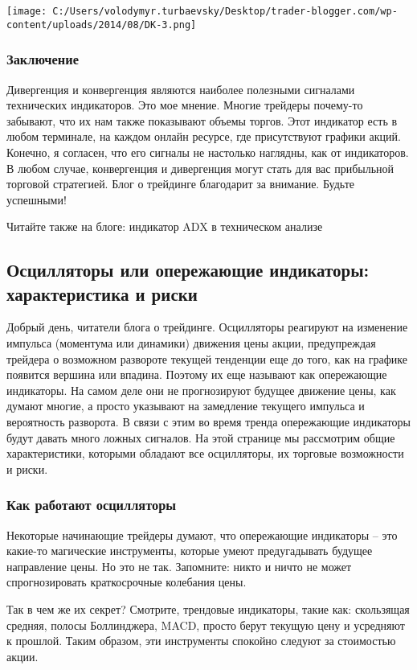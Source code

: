 \documentclass[a5paper]{article}
\begin{document}
\texttt{[image: C:/Users/volodymyr.turbaevsky/Desktop/trader-blogger.com/wp-content/uploads/2014/08/DK-3.png]}

\subsubsection{ Заключение}

Дивергенция и конвергенция являются наиболее полезными сигналами технических индикаторов. Это мое мнение.  Многие трейдеры почему-то забывают, что их нам также показывают объемы торгов. Этот индикатор есть в любом терминале, на каждом онлайн ресурсе, где присутствуют графики акций. Конечно, я согласен, что его сигналы не настолько наглядны, как от индикаторов. В любом случае, конвергенция и дивергенция могут стать для вас прибыльной торговой стратегией. Блог о трейдинге благодарит за внимание. Будьте успешными!


Читайте также на блоге: индикатор ADX в техническом анализе

\subsection{Осцилляторы или опережающие индикаторы: характеристика и
  риски}

Добрый день, читатели блога о трейдинге. Осцилляторы реагируют на изменение импульса (моментума или динамики) движения цены акции, предупреждая трейдера о возможном развороте текущей тенденции еще до того, как на графике появится вершина или впадина. Поэтому их еще называют как опережающие индикаторы. На самом деле они не прогнозируют будущее движение цены, как думают многие, а просто указывают на замедление текущего импульса и вероятность разворота. В связи с этим во время тренда опережающие индикаторы будут давать много ложных сигналов. На этой странице мы рассмотрим общие характеристики, которыми обладают все осцилляторы, их торговые возможности и риски.

\subsubsection{Как работают осцилляторы}

Некоторые начинающие трейдеры думают, что опережающие индикаторы – это какие-то магические инструменты, которые умеют предугадывать будущее направление цены. Но это не так. Запомните: никто и ничто не может спрогнозировать краткосрочные колебания цены.

Так в чем же их секрет? Смотрите, трендовые индикаторы, такие как: скользящая средняя, полосы Боллинджера, MACD, просто берут текущую цену и усредняют к прошлой. Таким образом, эти инструменты спокойно следуют за стоимостью акции.
\end{document}
